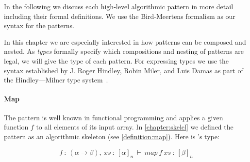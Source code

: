 In the following we discuss each high-level algorithmic pattern in more detail including their formal definitions.
We use the Bird-Meertens formalism as our syntax for the patterns.

In this chapter we are especially interested in how patterns can be composed and nested.
As \emph{types} formally specify which compositions and nesting of patterns are legal, we will give the type of each pattern.
For expressing types we use the syntax established by J. Roger Hindley, Robin Miler, and Luis Damas as part of the Hindley---Milner type system~\cite{}.


\paragraph{Map}
The  pattern is well known in functional programming and applies a given function $f$ to all elements of its input array.
In \autoref{chapter:skelcl} we defined the  pattern as an algorithmic skeleton (see \autoref{definition:map}).
Here is 's type:


\begin{align}
  f\ :\ (\alpha \rightarrow \beta),\ xs\ :\ [\alpha]_n\ \vdash\ map\ f\ xs\ :\ [\beta]_n
\end{align}

\begin{prooftree}
\end{prooftree}

